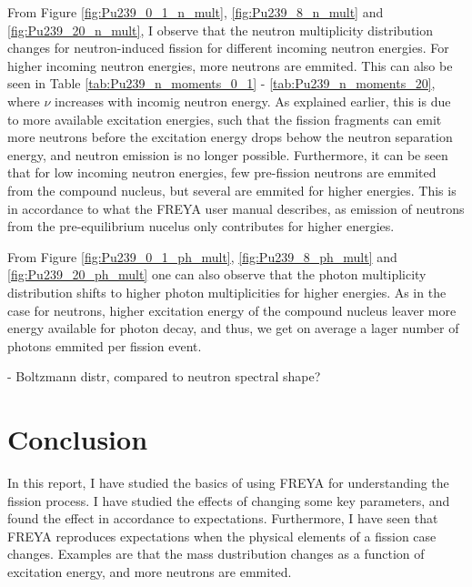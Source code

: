 \documentclass[]{article}
\begin{document}
From Figure \ref{fig:Pu239_0_1_n_mult}, \ref{fig:Pu239_8_n_mult} and \ref{fig:Pu239_20_n_mult}, I observe that the neutron multiplicity distribution changes for neutron-induced fission for different incoming neutron energies. For higher incoming neutron energies, more neutrons are emmited. This can also be seen in Table \ref{tab:Pu239_n_moments_0_1} - \ref{tab:Pu239_n_moments_20}, where $\nu$ increases with incomig neutron energy. As explained earlier, this is due to more available excitation energies, such that the fission fragments can emit more neutrons before the excitation energy drops behow the neutron separation energy, and neutron emission is no longer possible. Furthermore, it can be seen that for low incoming neutron energies, few pre-fission neutrons are emmited from the compound nucleus, but several are emmited for higher energies. This is in accordance to what the FREYA user manual describes, as emission of neutrons from the pre-equilibrium nucelus only contributes for higher energies.

From Figure \ref{fig:Pu239_0_1_ph_mult}, \ref{fig:Pu239_8_ph_mult} and \ref{fig:Pu239_20_ph_mult} one can also observe that the photon multiplicity distribution shifts to higher photon multiplicities for higher energies. As in the case for neutrons, higher excitation energy of the compound nucleus leaver more energy available for photon decay, and thus, we get on average a lager number of photons emmited per fission event.

- Boltzmann distr, compared to neutron spectral shape?


\section{Conclusion}
In this report, I have studied the basics of using FREYA for understanding the fission process. I have studied the effects of changing some key parameters, and found the effect in accordance to expectations. Furthermore, I have seen that FREYA reproduces expectations when the physical elements of a fission case changes. Examples are that the mass dustribution changes as a function of excitation energy, and more neutrons are emmited.



\vspace{3mm}

\newpage



\end{document}
